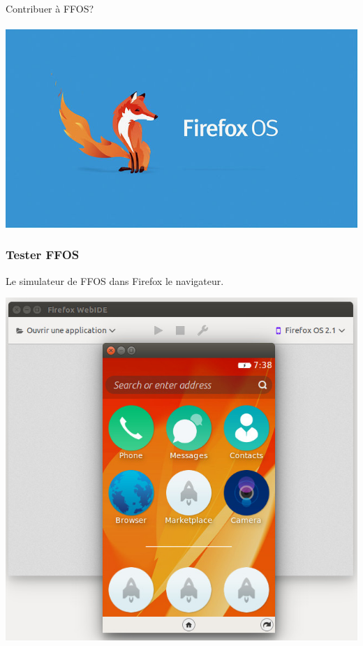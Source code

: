 \documentclass{beamer}
\begin{document}
\begin{frame}
\begin{center}
\Huge{Contribuer à FFOS?}
\\~\\
\includegraphics[scale=0.3]{./images/firefox-os.jpg}
\end{center}
\end{frame}
\begin{frame}
\frametitle{Tester FFOS}
Le simulateur de FFOS dans Firefox le navigateur. 

\begin{center}
\includegraphics[scale=0.3]{./images/ffos_simulator.jpg}
\end{center}
\end{frame}
\end{document}
